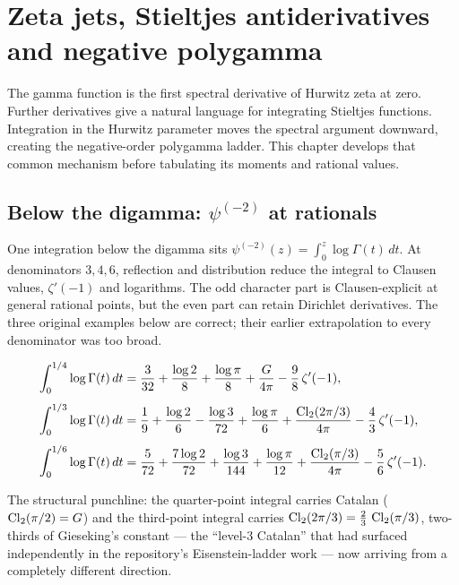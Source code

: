 \chapter{Zeta jets, Stieltjes antiderivatives and negative polygamma}
\label{ch:07-integration}

The gamma function is the first spectral derivative of Hurwitz zeta at zero.
Further derivatives give a natural language for integrating Stieltjes
functions. Integration in the Hurwitz parameter moves the spectral argument
downward, creating the negative-order polygamma ladder. This chapter develops
that common mechanism before tabulating its moments and rational values.

\section{Below the digamma: \texorpdfstring{$\psi^{(-2)}$}{psi(-2)} at rationals}
\label{integral:sec:psim2}

One integration below the digamma sits $\psi^{(-2)}(z)=\int_0^z\log\Gamma(t)\,dt$.
At denominators $3,4,6$, reflection and distribution reduce the
integral to Clausen values, $\zeta'(-1)$ and logarithms. The odd character
part is Clausen-explicit at general rational points, but the even part
can retain Dirichlet derivatives. The three original examples below are
correct; their earlier extrapolation to every denominator was too broad.

\begin{result}\label{integral:res:loggamma}
\begin{align*}
\int_0^{1/4}\log\Gamma(t)\,dt
&=\frac{3}{32}+\frac{\log2}{8}+\frac{\log\pi}{8}
+\frac{G}{4\pi}-\frac{9}{8}\,\zeta'(-1),\\[4pt]
\int_0^{1/3}\log\Gamma(t)\,dt
&=\frac{1}{9}+\frac{\log2}{6}-\frac{\log3}{72}+\frac{\log\pi}{6}
+\frac{\operatorname{Cl}_2(2\pi/3)}{4\pi}-\frac{4}{3}\,\zeta'(-1),\\[4pt]
\int_0^{1/6}\log\Gamma(t)\,dt
&=\frac{5}{72}+\frac{7\log2}{72}+\frac{\log3}{144}+\frac{\log\pi}{12}
+\frac{\operatorname{Cl}_2(\pi/3)}{4\pi}-\frac{5}{6}\,\zeta'(-1).
\end{align*}
\end{result}

The structural punchline: the quarter-point integral carries Catalan
($\operatorname{Cl}_2(\pi/2)=G$) and the third-point integral carries
$\operatorname{Cl}_2(2\pi/3)=\tfrac23\,\operatorname{Cl}_2(\pi/3)$, two-thirds of Gieseking's constant --- the
``level-3 Catalan'' that had surfaced independently in the
repository's Eisenstein-ladder work --- now arriving from a completely different direction.

